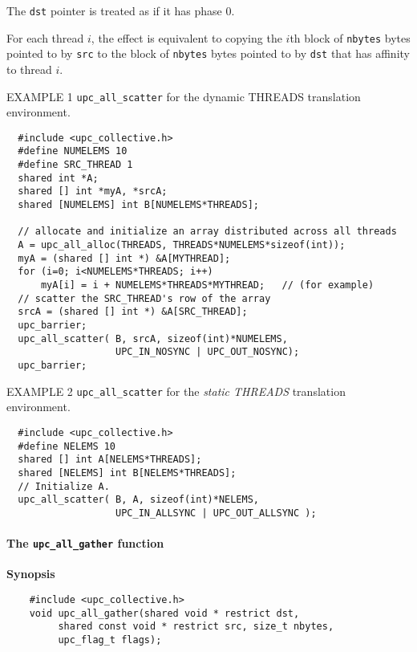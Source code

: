 \np The {\tt dst} pointer is treated as if it has phase 0.

\np For each thread $i$, the effect is equivalent to copying
the $i$th block of {\tt nbytes} bytes pointed to by {\tt src} to
the block of {\tt nbytes} bytes 
pointed to by {\tt dst} that has affinity to thread $i$.


\np EXAMPLE 1 {\tt upc\_all\_scatter} for the {dynamic THREADS} translation
environment.

\begin{verbatim}
  #include <upc_collective.h>
  #define NUMELEMS 10
  #define SRC_THREAD 1
  shared int *A;
  shared [] int *myA, *srcA;
  shared [NUMELEMS] int B[NUMELEMS*THREADS];

  // allocate and initialize an array distributed across all threads
  A = upc_all_alloc(THREADS, THREADS*NUMELEMS*sizeof(int));
  myA = (shared [] int *) &A[MYTHREAD];
  for (i=0; i<NUMELEMS*THREADS; i++)
      myA[i] = i + NUMELEMS*THREADS*MYTHREAD;   // (for example)
  // scatter the SRC_THREAD's row of the array
  srcA = (shared [] int *) &A[SRC_THREAD];
  upc_barrier;
  upc_all_scatter( B, srcA, sizeof(int)*NUMELEMS,
                   UPC_IN_NOSYNC | UPC_OUT_NOSYNC);
  upc_barrier;
\end{verbatim}

\np EXAMPLE 2 {\tt upc\_all\_scatter} for the {\em static THREADS} 
translation environment.

\begin{verbatim}
  #include <upc_collective.h>
  #define NELEMS 10
  shared [] int A[NELEMS*THREADS];
  shared [NELEMS] int B[NELEMS*THREADS];
  // Initialize A.
  upc_all_scatter( B, A, sizeof(int)*NELEMS,
                   UPC_IN_ALLSYNC | UPC_OUT_ALLSYNC );
\end{verbatim}

\paragraph{The {\tt upc\_all\_gather} function}

{\bf Synopsis} 

\npf\vspace{-2.5em} 

\begin{verbatim}
    #include <upc_collective.h>
    void upc_all_gather(shared void * restrict dst,
         shared const void * restrict src, size_t nbytes,
         upc_flag_t flags);
\end{verbatim}


